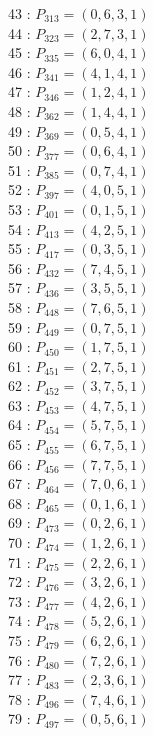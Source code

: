\documentclass{article}
\begin{document}
{\begin{multicols}{3}
43 : $P_{313}=( 0, 6, 3, 1 )$\\
44 : $P_{323}=( 2, 7, 3, 1 )$\\
45 : $P_{335}=( 6, 0, 4, 1 )$\\
46 : $P_{341}=( 4, 1, 4, 1 )$\\
47 : $P_{346}=( 1, 2, 4, 1 )$\\
48 : $P_{362}=( 1, 4, 4, 1 )$\\
49 : $P_{369}=( 0, 5, 4, 1 )$\\
50 : $P_{377}=( 0, 6, 4, 1 )$\\
51 : $P_{385}=( 0, 7, 4, 1 )$\\
52 : $P_{397}=( 4, 0, 5, 1 )$\\
53 : $P_{401}=( 0, 1, 5, 1 )$\\
54 : $P_{413}=( 4, 2, 5, 1 )$\\
55 : $P_{417}=( 0, 3, 5, 1 )$\\
56 : $P_{432}=( 7, 4, 5, 1 )$\\
57 : $P_{436}=( 3, 5, 5, 1 )$\\
58 : $P_{448}=( 7, 6, 5, 1 )$\\
59 : $P_{449}=( 0, 7, 5, 1 )$\\
60 : $P_{450}=( 1, 7, 5, 1 )$\\
61 : $P_{451}=( 2, 7, 5, 1 )$\\
62 : $P_{452}=( 3, 7, 5, 1 )$\\
63 : $P_{453}=( 4, 7, 5, 1 )$\\
64 : $P_{454}=( 5, 7, 5, 1 )$\\
65 : $P_{455}=( 6, 7, 5, 1 )$\\
66 : $P_{456}=( 7, 7, 5, 1 )$\\
67 : $P_{464}=( 7, 0, 6, 1 )$\\
68 : $P_{465}=( 0, 1, 6, 1 )$\\
69 : $P_{473}=( 0, 2, 6, 1 )$\\
70 : $P_{474}=( 1, 2, 6, 1 )$\\
71 : $P_{475}=( 2, 2, 6, 1 )$\\
72 : $P_{476}=( 3, 2, 6, 1 )$\\
73 : $P_{477}=( 4, 2, 6, 1 )$\\
74 : $P_{478}=( 5, 2, 6, 1 )$\\
75 : $P_{479}=( 6, 2, 6, 1 )$\\
76 : $P_{480}=( 7, 2, 6, 1 )$\\
77 : $P_{483}=( 2, 3, 6, 1 )$\\
78 : $P_{496}=( 7, 4, 6, 1 )$\\
79 : $P_{497}=( 0, 5, 6, 1 )$\\

\end{multicols}}
\end{document}
